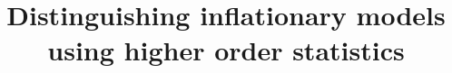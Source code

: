 % 
% 
% 
% 
% 
% 
% 
\title{Distinguishing inflationary models using higher order statistics}
% 
% 
\maketitle